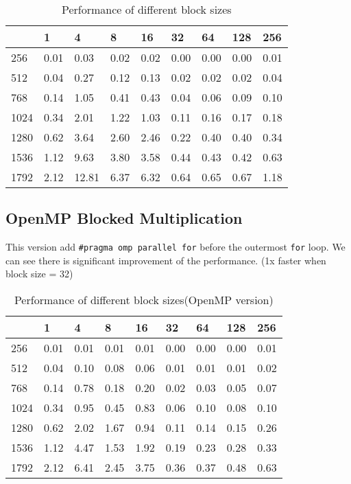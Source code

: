 \documentclass{article}
\begin{document}
        \newpage
        \begin{table}[hbt!]
            \centering
            \begin{tabular}{|l|l|l|l|l|l|l|l|l|}
            \hline
             & 1 & 4 & 8 & 16 & 32 & 64 & 128 & 256 \\ \hline
            256 & 0.01 & 0.03 & 0.02 & 0.02 & 0.00 & 0.00 & 0.00 & 0.01 \\ \hline
            512 & 0.04 & 0.27 & 0.12 & 0.13 & 0.02 & 0.02 & 0.02 & 0.04 \\ \hline
            768 & 0.14 & 1.05 & 0.41 & 0.43 & 0.04 & 0.06 & 0.09 & 0.10 \\ \hline
            1024 & 0.34 & 2.01 & 1.22 & 1.03 & 0.11 & 0.16 & 0.17 & 0.18 \\ \hline
            1280 & 0.62 & 3.64 & 2.60 & 2.46 & 0.22 & 0.40 & 0.40 & 0.34 \\ \hline
            1536 & 1.12 & 9.63 & 3.80 & 3.58 & 0.44 & 0.43 & 0.42 & 0.63 \\ \hline
            1792 & 2.12 & 12.81 & 6.37 & 6.32 & 0.64 & 0.65 & 0.67 & 1.18 \\ \hline
            \end{tabular}
            \caption{Performance of different block sizes}
        \end{table}
    \subsection{OpenMP Blocked Multiplication}
        This version add \verb|#pragma omp parallel for| before the outermost \verb|for| loop. We can see there is significant improvement of the performance. (1x faster when block size = 32)
        \begin{table}[hbt!]
            \centering
            \begin{tabular}{|l|l|l|l|l|l|l|l|l|}
            \hline
             & 1 & 4 & 8 & 16 & 32 & 64 & 128 & 256 \\ \hline
            256 & 0.01 & 0.01 & 0.01 & 0.01 & 0.00 & 0.00 & 0.00 & 0.01 \\ \hline
            512 & 0.04 & 0.10 & 0.08 & 0.06 & 0.01 & 0.01 & 0.01 & 0.02 \\ \hline
            768 & 0.14 & 0.78 & 0.18 & 0.20 & 0.02 & 0.03 & 0.05 & 0.07 \\ \hline
            1024 & 0.34 & 0.95 & 0.45 & 0.83 & 0.06 & 0.10 & 0.08 & 0.10 \\ \hline
            1280 & 0.62 & 2.02 & 1.67 & 0.94 & 0.11 & 0.14 & 0.15 & 0.26 \\ \hline
            1536 & 1.12 & 4.47 & 1.53 & 1.92 & 0.19 & 0.23 & 0.28 & 0.33 \\ \hline
            1792 & 2.12 & 6.41 & 2.45 & 3.75 & 0.36 & 0.37 & 0.48 & 0.63 \\ \hline
            \end{tabular}
            \caption{Performance of different block sizes(OpenMP version)}
        \end{table}
\end{document}
